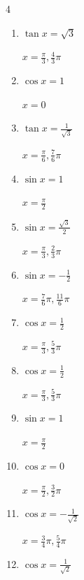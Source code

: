 \begin{multicols}{4}
\begin{enumerate}
        $\displaystyle x = \frac{\pi}{4} , \frac{5}{4}\pi$

\columnbreak %

  \item $\displaystyle \tan{x}  = \sqrt{3}$

        $\displaystyle x = \frac{\pi}{3} , \frac{4}{3}\pi$

  \item $\displaystyle \cos{x}  = 1$

        $\displaystyle x = 0$

  \item $\displaystyle \tan{x}  = \frac{1}{\sqrt{3}}$

        $\displaystyle x = \frac{\pi}{6} , \frac{7}{6}\pi$

  \item $\displaystyle \sin{x}  = 1$

        $\displaystyle x = \frac{\pi}{2}$

  \item $\displaystyle \sin{x}  = \frac{\sqrt{3}}{2}$

        $\displaystyle x = \frac{\pi}{3} , \frac{2}{3}\pi$

  \item $\displaystyle \sin{x}  = -\frac{1}{2}$

        $\displaystyle x = \frac{7}{6}\pi , \frac{11}{6}\pi$

  \item $\displaystyle \cos{x}  = \frac{1}{2}$

        $\displaystyle x = \frac{\pi}{3} , \frac{5}{3}\pi$

  \item $\displaystyle \cos{x}  = \frac{1}{2}$

        $\displaystyle x = \frac{\pi}{3} , \frac{5}{3}\pi$

  \item $\displaystyle \sin{x}  = 1$

        $\displaystyle x = \frac{\pi}{2}$

  \item $\displaystyle \cos{x}  = 0$

        $\displaystyle x = \frac{\pi}{2} , \frac{3}{2}\pi$

  \item $\displaystyle \cos{x}  = -\frac{1}{\sqrt{2}}$

        $\displaystyle x = \frac{3}{4}\pi , \frac{5}{4}\pi$

  \item $\displaystyle \cos{x}  = \frac{1}{\sqrt{2}}$


\end{enumerate}
\end{multicols}
